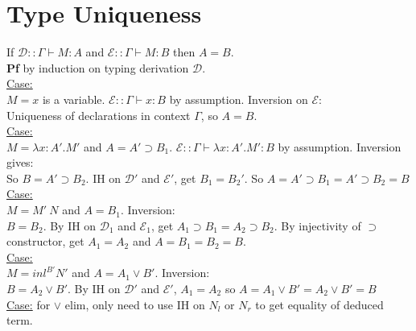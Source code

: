 \section{Type Uniqueness}
If $\mathcal{D} :: \Gamma \vdash M : A$ and $\mathcal{E} :: \Gamma
\vdash M : B$ then $A = B$.
\\ \textbf{Pf} by induction on typing derivation $\mathcal{D}$.
\\ \underline{Case:} 
\\ $M = x$ is a variable. $\mathcal{E} :: \Gamma \vdash x : B$ by
assumption. Inversion on $\mathcal{E}$: 
\\ Uniqueness of declarations in context $\Gamma$, so $A = B$.
\\ \underline{Case:} 
\\ $M = \lambda x : A'.M'$ and $A = A' \supset B_1$. $\mathcal{E} ::
\Gamma \vdash \lambda x : A'.M' : B$ by assumption. Inversion gives:
\\ So $B = A' \supset B_2$. IH on $\mathcal{D}'$ and $\mathcal{E}'$,
get $B_1 = B_2'$. So $A = A' \supset B_1 = A' \supset B_2 = B$
\\ \underline{Case:}
\\ $M = M'\ N$ and $A = B_1$. Inversion:
\\ $B = B_2$. By IH on $\mathcal{D}_1$ and $\mathcal{E}_1$, get $A_1
\supset B_1 = A_2 \supset B_2$. By injectivity of $\supset$
constructor, get $A_1 = A_2$ and $A = B_1 = B_2 = B$.
\\ \underline{Case:}
\\ $M = inl^{B'}N'$ and $A = A_1 \lor B'$. Inversion:
\\ $B = A_2 \lor B'$. By IH on $\mathcal{D}'$ and $\mathcal{E}'$,
$A_1 = A_2$ so $A = A_1 \lor B' = A_2 \lor B' = B$
\\ \underline{Case:} for $\lor$ elim, only need to use IH on $N_l$ or
$N_r$ to get equality of deduced term.
\color{Black}
